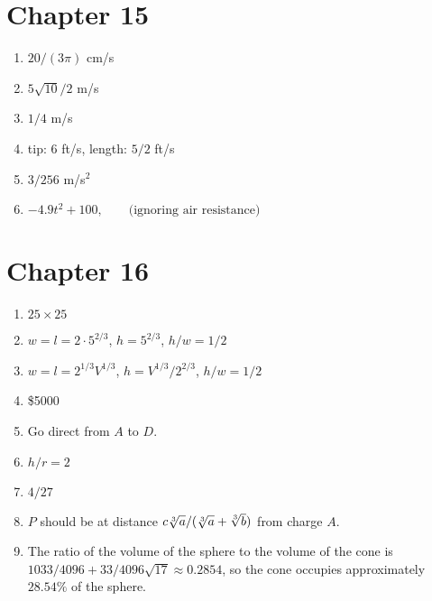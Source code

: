 \section*{Chapter 15}
\twocol
\begin{enumerate}
    \item $20/(3\pi)$ cm/s
    \item $5\sqrt{10}/2$ m/s
    \item $1/4$ m/s
    \item tip: 6 ft/s, length: $5/2$ ft/s
    \item $3/256$ m/s$^2$
    \item $-4.9t^2+100,\qquad\text{(ignoring air resistance)}$
\end{enumerate}
\endtwocol

\section*{Chapter 16}
\twocol
\begin{enumerate}
    \item $25\times 25$
    \item $w=l=2\cdot 5^{2/3}$, $h=5^{2/3}$, $h/w=1/2$
    \item $w=l=2^{1/3}V^{1/3}$, $h=V^{1/3}/2^{2/3}$, $h/w=1/2$
    \item \$5000
    \item Go direct from $A$ to $D$.
    \item $h/r=2$
    \item $4/27$
    \item $P$ should be at distance $c\root 3\of {a} /
    (\root 3\of {a} + \root 3\of {b})$ from charge $A$.
    \item The ratio of the volume of the sphere to the volume of the
    cone is $1033/4096+33/4096\sqrt{17}\approx 0.2854$, so the cone
    occupies approximately $28.54\%$ of the sphere.
\end{enumerate}
\endtwocol
